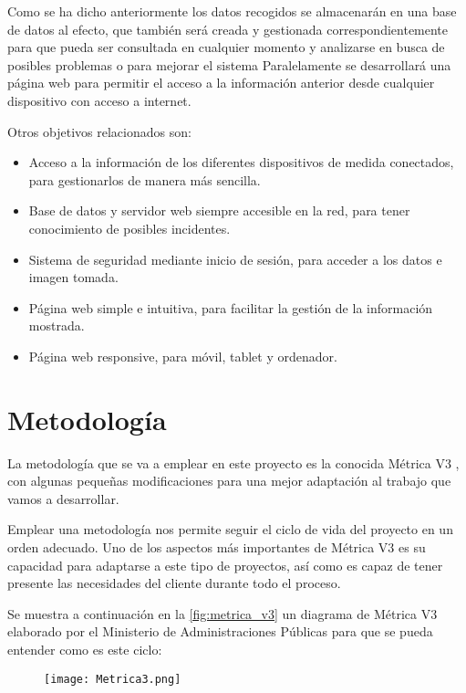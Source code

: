 Como se ha dicho anteriormente los datos recogidos se almacenarán en una base de datos al efecto, que también será creada y gestionada correspondientemente para que pueda ser consultada  en cualquier momento y analizarse en busca de posibles problemas o para mejorar el sistema Paralelamente se desarrollará una página web para permitir el acceso a la información anterior desde cualquier dispositivo con acceso a internet.

Otros objetivos relacionados son:
\begin{itemize}
    \item Acceso a la información de los diferentes dispositivos de medida conectados, para gestionarlos de manera más sencilla.
    \item Base de datos y servidor web siempre accesible en la red, para tener conocimiento de posibles incidentes.
    \item Sistema de seguridad mediante inicio de sesión, para acceder a los datos e imagen tomada.
    \item Página web simple e intuitiva, para facilitar la gestión de la información mostrada.
    \item Página web responsive, para móvil, tablet y ordenador.
\end{itemize}

\section{Metodología}
La metodología que se va a emplear en este proyecto es la conocida Métrica V3 \cite{portal_administracion_electronica_metrica_nodate}, con algunas pequeñas modificaciones para una mejor adaptación al trabajo que vamos a desarrollar.

Emplear una metodología nos permite seguir el ciclo de vida del proyecto en un orden adecuado. Uno de los aspectos más importantes de Métrica V3 es su capacidad para adaptarse a este tipo de proyectos, así como es capaz de tener presente  las necesidades del cliente durante todo el proceso.

Se muestra a continuación en la \autoref{fig:metrica_v3} un diagrama de Métrica V3 elaborado por el Ministerio de Administraciones Públicas para que se pueda entender como es este ciclo:

\begin{figure}[H]
	{\texttt{[image: Metrica3.png]}}
\end{figure}

